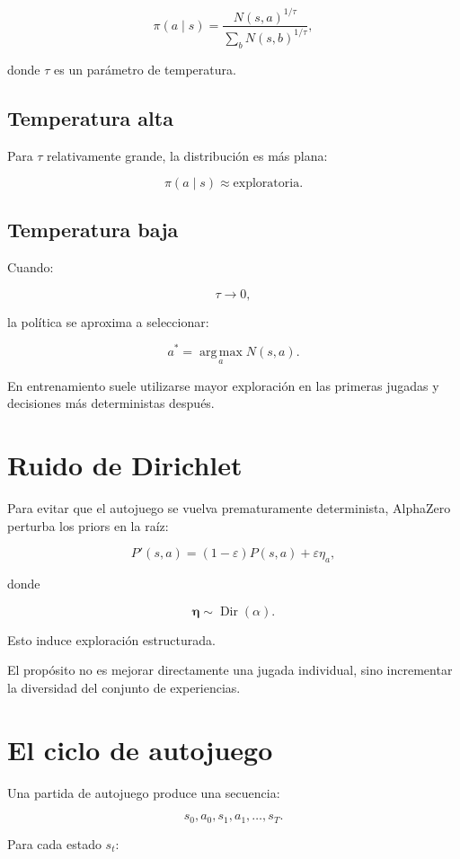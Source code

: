 \documentclass[11pt,a4paper]{article}
\newcommand{\argmax}{\operatorname*{arg\,max}}
\begin{document}
\[
\pi(a\mid s)
=
\frac{N(s,a)^{1/\tau}}
{\sum_b N(s,b)^{1/\tau}},
\]

donde \(\tau\) es un parámetro de temperatura.

\subsection{Temperatura alta}

Para \(\tau\) relativamente grande, la distribución es más plana:

\[
\pi(a\mid s)
\approx
\text{exploratoria}.
\]

\subsection{Temperatura baja}

Cuando:

\[
\tau\rightarrow 0,
\]

la política se aproxima a seleccionar:

\[
a^*
=
\argmax_a N(s,a).
\]

En entrenamiento suele utilizarse mayor exploración en las primeras jugadas y decisiones más deterministas después.

\section{Ruido de Dirichlet}

Para evitar que el autojuego se vuelva prematuramente determinista, AlphaZero perturba los priors en la raíz:

\[
P'(s,a)
=
(1-\varepsilon)P(s,a)
+
\varepsilon \eta_a,
\]

donde

\[
\bm{\eta}
\sim
\operatorname{Dir}(\alpha).
\]

Esto induce exploración estructurada.

El propósito no es mejorar directamente una jugada individual, sino incrementar la diversidad del conjunto de experiencias.

\section{El ciclo de autojuego}

Una partida de autojuego produce una secuencia:

\[
s_0,a_0,s_1,a_1,\ldots,s_T.
\]

Para cada estado \(s_t\):
\end{document}
